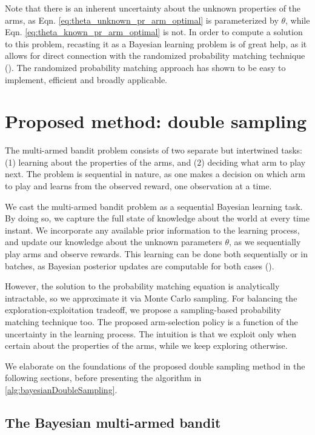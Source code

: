 \documentclass[10pt]{article}
\begin{document}
Note that there is an inherent uncertainty about the unknown properties of the arms, as Eqn. \ref{eq:theta_unknown_pr_arm_optimal} is parameterized by $\theta$, while Eqn. \ref{eq:theta_known_pr_arm_optimal} is not. In order to compute a solution to this problem, recasting it as a Bayesian learning problem is of great help, as it allows for direct connection with the randomized probability matching technique (\cite{j-Scott2010}). The randomized probability matching approach has shown to be easy to implement, efficient and broadly applicable.

\section{Proposed method: double sampling}
\label{sec:proposed_method}

The multi-armed bandit problem consists of two separate but intertwined tasks: (1) learning about the properties of the arms, and (2) deciding what arm to play next. The problem is sequential in nature, as one makes a decision on which arm to play and learns from the observed reward, one observation at a time.

We cast the multi-armed bandit problem as a sequential Bayesian learning task. By doing so, we capture the full state of knowledge about the world at every time instant. We incorporate any available prior information to the learning process, and update our knowledge about the unknown parameters $\theta$, as we sequentially play arms and observe rewards. This learning can be done both sequentially or in batches, as Bayesian posterior updates are computable for both cases (\cite{b-Bernardo2009}).

However, the solution to the probability matching equation is analytically intractable, so we approximate it via Monte Carlo sampling. For balancing the exploration-exploitation tradeoff, we propose a sampling-based probability matching technique too. The proposed arm-selection policy is a function of the uncertainty in the learning process. The intuition is that we exploit only when certain about the properties of the arms, while we keep exploring otherwise.

We elaborate on the foundations of the proposed double sampling method in the following sections, before presenting the algorithm in \autoref{alg:bayesianDoubleSampling}.

\subsection{The Bayesian multi-armed bandit}
\label{ssec:bayesian_multi_armed_bandit}
\end{document}
